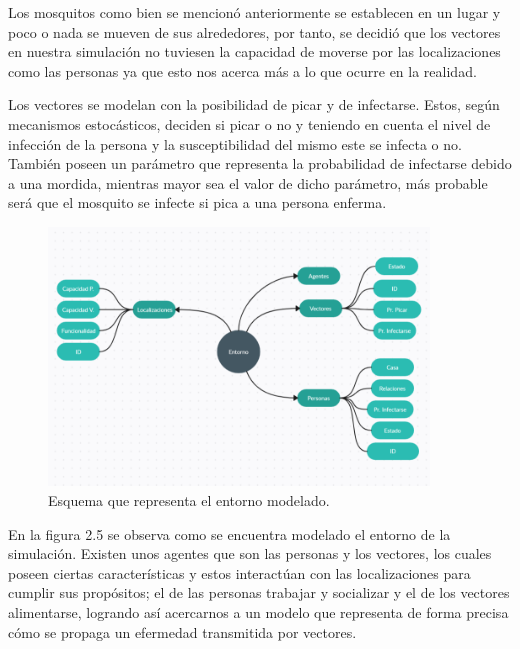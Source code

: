 Los mosquitos como bien se mencionó anteriormente se establecen en un lugar y poco o nada se mueven de 
sus alrededores, por tanto, se decidió que los vectores en nuestra simulación no tuviesen la capacidad de moverse por
las localizaciones como las personas ya que esto nos acerca más a lo que ocurre en la realidad.

Los vectores se modelan con la posibilidad de picar y de infectarse. Estos, según mecanismos estocásticos,
deciden si picar o no y teniendo en cuenta el nivel de infección de la persona y la susceptibilidad del mismo este
se infecta o no. También poseen un parámetro que representa la probabilidad de infectarse debido a una mordida, mientras
mayor sea el valor de dicho parámetro, más probable será que el mosquito se infecte si pica a una persona enferma.

\begin{figure}[htb]
    \centering
    \includegraphics[width=0.9\textwidth]{Graphics/Pers_Loc_Vec.png}
    \caption{Esquema que representa el entorno modelado.}
\end{figure}
En la figura 2.5 se observa como se encuentra modelado el entorno de la simulación. Existen unos agentes que son las
personas y los vectores, los cuales poseen ciertas características y estos interactúan con las localizaciones para
cumplir sus propósitos; el de las personas trabajar y socializar y el de los vectores alimentarse, logrando así
acercarnos a un modelo que representa de forma precisa cómo se propaga un efermedad transmitida por vectores.

